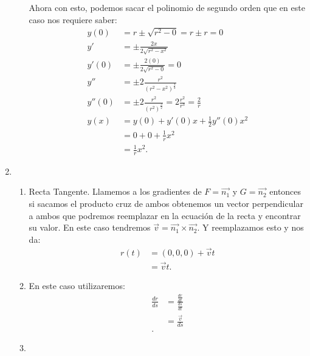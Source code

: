 \begin{enumerate}
\begin{enumerate}
	    Ahora con esto, podemos sacar el polinomio de segundo orden que en este caso nos requiere saber:
	    \begin{align*}
	      y\left( 0 \right) &= r \pm \sqrt{r^2-0}= r \pm r = 0 \\
	      y' &= \pm \frac{2x}{2\sqrt{r^2 - x^2} }  \\
	      y'\left( 0 \right) &= \pm \frac{2\left( 0 \right) }{2\sqrt{r^2-0} }=0 \\
	      y'' &= \pm 2 \frac{r^2}{\left( r^2-x^2 \right)^{\frac{3}{2}}}\\
	      y''\left( 0 \right) &= \pm 2 \frac{r^2}{\left( r^2 \right)^{\frac{3}{2}}}=2 \frac{r^2}{r^{3}}=\frac{2}{r} \\
	      y\left( x \right) &= y\left( 0 \right) + y'\left( 0 \right) x + \frac{1}{2}y''\left( 0 \right) x^2\\
	      &= 0 + 0 +\frac{1}{r}x^2 \\
	      &= \frac{1}{r}x^2
	    .\end{align*}
	\end{enumerate}
      \item 
	\begin{enumerate}
	  \item Recta Tangente. Llamemos a los gradientes de $F=\Vec{n_1}$ y $G=\Vec{n_2}$ entonces si sacamos el producto cruz de ambos obtenemos un vector perpendicular a ambos que podremos reemplazar en la ecuación de la recta y encontrar su valor. En este caso tendremos $\Vec{v} = \Vec{n_1}\times \Vec{n_2}$. Y reemplazamos esto y nos da:
	 \begin{align*}
	   r\left( t \right) &= (0,0,0) + \Vec{v}t\\
			     &= \Vec{v}t
	 .\end{align*}
       \item En este caso utilizaremos:
	 \begin{align*}
	   \frac{dr}{ds} &= \frac{\frac{dr}{dt}}{\frac{ds}{dt}}\\
			 &= \frac{\Vec{v}}{ds} \\
	 .\end{align*}
       \item 

	\end{enumerate}
    \end{enumerate}

